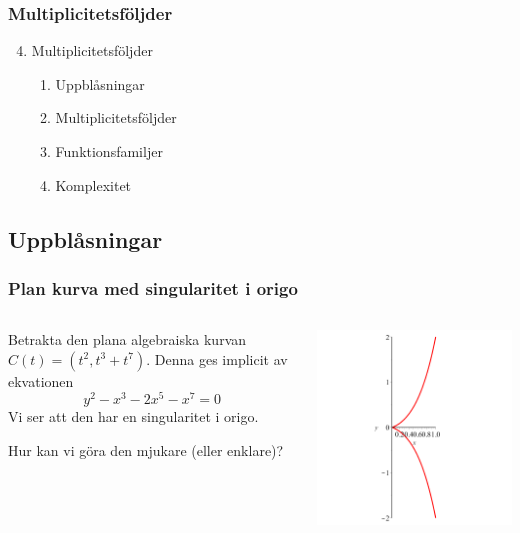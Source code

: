 \documentclass{beamer}
\begin{document}
\begin{frame}
	\frametitle{Multiplicitetsföljder}
	\begin{enumerate}
		\setcounter{enumi}{3}
		\item<1-> Multiplicitetsföljder
		\begin{enumerate}
			\item<2-> Uppblåsningar
			\item<3-> Multiplicitetsföljder
			\item<4-> Funktionsfamiljer
			\item<5-> Komplexitet
		\end{enumerate}
	\end{enumerate}
\end{frame}

\subsection{Uppblåsningar}

\begin{frame}
	\frametitle{Plan kurva med singularitet i origo}
	\begin{columns}[onlytextwidth]
		\begin{column}{0.5\textwidth}
			Betrakta den plana algebraiska kurvan $C(t)=(t^2,t^3+t^7)$. Denna ges implicit av ekvationen
			\[y^2-x^3-2x^5-x^7 = 0\]
			Vi ser att den har en singularitet i origo.
			
			\vspace{20pt}
			Hur kan vi göra den mjukare (eller enklare)?
		\end{column}
		\begin{column}{0.5\textwidth}
			\begin{center}
				\includegraphics[scale=0.35]{Export/blowupex1_1.png}
			\end{center}
		\end{column}
	\end{columns}	
\end{frame}
\end{document}
